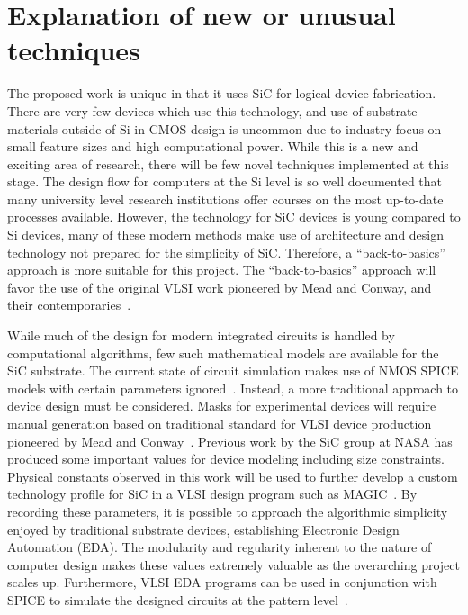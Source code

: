\documentclass[12pt]{amsart}
\begin{document}
 	\section{Explanation of new or unusual techniques}
 	
 	The proposed work is unique in that it uses SiC for logical device fabrication.  There are very few devices which use this technology, and use of substrate materials outside of Si in CMOS design is uncommon due to industry focus on small feature sizes and high computational power.  While this is a new and exciting area of research, there will be few novel techniques implemented at this stage.  The design flow for computers at the Si level is so well documented that many university level research institutions offer courses on the most up-to-date processes available.  However, the technology for SiC devices is young compared to Si devices, many of these modern methods make use of architecture and design technology not prepared for the simplicity of SiC.  Therefore, a ``back-to-basics'' approach is more suitable for this project.  The ``back-to-basics'' approach will favor the use of the original VLSI work pioneered by Mead and Conway, and their contemporaries~\cite{mead_introduction_1980,pucknell_basic_1988,slater_microprocessor-based_1987}.
 	
	While much of the design for modern integrated circuits is handled by computational algorithms, few such mathematical models are available for the SiC substrate.  The current state of circuit simulation makes use of NMOS SPICE models with certain parameters ignored~\cite{neudeck_first-order_2016}.  Instead, a more traditional approach to device design must be considered.  Masks for experimental devices will require manual generation based on traditional standard for VLSI device production pioneered by Mead and Conway~\cite{mead_introduction_1980}.  Previous work by the SiC group at NASA has produced some important values for device modeling including size constraints.  Physical constants observed in this work will be used to further develop a custom technology profile for SiC in a VLSI design program such as MAGIC~\cite{ousterhout1985magic}.  By recording these parameters, it is possible to approach the algorithmic simplicity enjoyed by traditional substrate devices, establishing Electronic Design Automation (EDA).  The modularity and regularity inherent to the nature of computer design makes these values extremely valuable as the overarching project scales up.  Furthermore, VLSI EDA programs can be used in conjunction with SPICE to simulate the designed circuits at the pattern level~\cite{Nagel:M382}.  
 	
\end{document}

